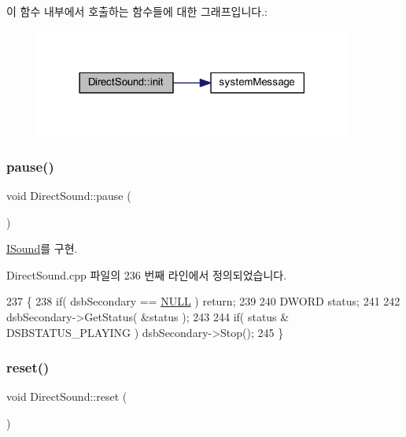 이 함수 내부에서 호출하는 함수들에 대한 그래프입니다.\+:
\nopagebreak
\begin{figure}[H]
\begin{center}
\leavevmode
\includegraphics[width=294pt]{class_direct_sound_a006583b3b3c1b16ca4c54bf9a6141fb9_cgraph}
\end{center}
\end{figure}
\mbox{\label{class_direct_sound_a33ee46c99ddf8f06bd6605ec14798f4b}} 
\subsubsection{\texorpdfstring{pause()}{pause()}}
{\footnotesize\ttfamily void Direct\+Sound\+::pause (\begin{DoxyParamCaption}{ }\end{DoxyParamCaption})\hspace{0.3cm}{\ttfamily [virtual]}}



\mbox{\hyperlink{class_i_sound_a9fb848e0e31ab8bcd5384b0422855c3d}{I\+Sound}}를 구현.



Direct\+Sound.\+cpp 파일의 236 번째 라인에서 정의되었습니다.


\begin{DoxyCode}
237 \{
238     \textcolor{keywordflow}{if}( dsbSecondary == \mbox{\hyperlink{getopt1_8c_a070d2ce7b6bb7e5c05602aa8c308d0c4}{NULL}} ) \textcolor{keywordflow}{return};
239     
240     DWORD status;
241 
242     dsbSecondary->GetStatus( &status );
243 
244     \textcolor{keywordflow}{if}( status & DSBSTATUS\_PLAYING ) dsbSecondary->Stop();
245 \}
\end{DoxyCode}
\mbox{\label{class_direct_sound_aa947e57a1a67df3a609cd403b8c97bb8}} 
\subsubsection{\texorpdfstring{reset()}{reset()}}
{\footnotesize\ttfamily void Direct\+Sound\+::reset (\begin{DoxyParamCaption}{ }\end{DoxyParamCaption})\hspace{0.3cm}{\ttfamily [virtual]}}



